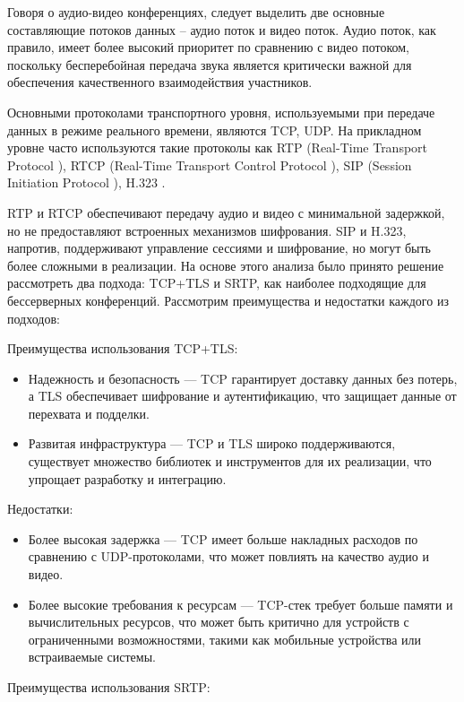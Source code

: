 Говоря о аудио-видео конференциях, следует выделить две основные составляющие потоков данных -- аудио поток и видео поток.
Аудио поток, как правило, имеет более высокий приоритет по сравнению с видео потоком, поскольку бесперебойная передача звука является критически важной для обеспечения качественного взаимодействия участников.

Основными протоколами транспортного уровня, используемыми при передаче данных в режиме реального времени, являются TCP, UDP.
На прикладном уровне часто используются такие протоколы как RTP (Real-Time Transport Protocol  \cite{rtp}), RTCP (Real-Time Transport Control Protocol  \cite{rtp}), SIP (Session Initiation Protocol \cite{sip}), H.323 \cite{h323}.

RTP и RTCP обеспечивают передачу аудио и видео с минимальной задержкой, но не предоставляют встроенных механизмов шифрования.
SIP и H.323, напротив, поддерживают управление сессиями и шифрование, но могут быть более сложными в реализации.
На основе этого анализа было принято решение рассмотреть два подхода: TCP+TLS и SRTP, как наиболее подходящие для бессерверных конференций.
Рассмотрим преимущества и недостатки каждого из подходов:

Преимущества использования TCP+TLS:

\begin{itemize}[label=---]
  \item Надежность и безопасность --- TCP гарантирует доставку данных без потерь, а TLS обеспечивает шифрование и аутентификацию, что защищает данные от перехвата и подделки.
  \item Развитая инфраструктура --- TCP и TLS широко поддерживаются, существует множество библиотек и инструментов для их реализации, что упрощает разработку и интеграцию.
\end{itemize}

Недостатки:

\begin{itemize}[label=---]
  \item Более высокая задержка --- TCP имеет больше накладных расходов по сравнению с UDP-протоколами, что может повлиять на качество аудио и видео.
  \item Более высокие требования к ресурсам --- TCP-стек требует больше памяти и вычислительных ресурсов, что может быть критично для устройств с ограниченными возможностями, такими как мобильные устройства или встраиваемые системы.
\end{itemize}

Преимущества использования SRTP:

